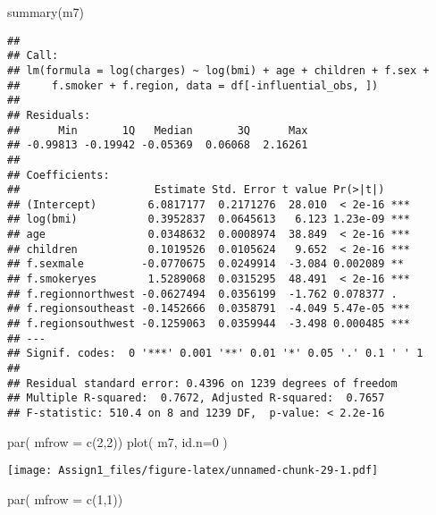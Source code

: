 \documentclass[
]{article}
\newenvironment{Shaded}{\begin{snugshade}}{\end{snugshade}}
\newcommand{\AttributeTok}[1]{\textcolor[rgb]{0.77,0.63,0.00}{#1}}
\newcommand{\DecValTok}[1]{\textcolor[rgb]{0.00,0.00,0.81}{#1}}
\newcommand{\FunctionTok}[1]{\textcolor[rgb]{0.00,0.00,0.00}{#1}}
\newcommand{\NormalTok}[1]{#1}
\begin{document}
\begin{Shaded}
\begin{Highlighting}[]
\FunctionTok{summary}\NormalTok{(m7)}
\end{Highlighting}
\end{Shaded}

\begin{verbatim}
## 
## Call:
## lm(formula = log(charges) ~ log(bmi) + age + children + f.sex + 
##     f.smoker + f.region, data = df[-influential_obs, ])
## 
## Residuals:
##      Min       1Q   Median       3Q      Max 
## -0.99813 -0.19942 -0.05369  0.06068  2.16261 
## 
## Coefficients:
##                     Estimate Std. Error t value Pr(>|t|)    
## (Intercept)        6.0817177  0.2171276  28.010  < 2e-16 ***
## log(bmi)           0.3952837  0.0645613   6.123 1.23e-09 ***
## age                0.0348632  0.0008974  38.849  < 2e-16 ***
## children           0.1019526  0.0105624   9.652  < 2e-16 ***
## f.sexmale         -0.0770675  0.0249914  -3.084 0.002089 ** 
## f.smokeryes        1.5289068  0.0315295  48.491  < 2e-16 ***
## f.regionnorthwest -0.0627494  0.0356199  -1.762 0.078377 .  
## f.regionsoutheast -0.1452666  0.0358791  -4.049 5.47e-05 ***
## f.regionsouthwest -0.1259063  0.0359944  -3.498 0.000485 ***
## ---
## Signif. codes:  0 '***' 0.001 '**' 0.01 '*' 0.05 '.' 0.1 ' ' 1
## 
## Residual standard error: 0.4396 on 1239 degrees of freedom
## Multiple R-squared:  0.7672, Adjusted R-squared:  0.7657 
## F-statistic: 510.4 on 8 and 1239 DF,  p-value: < 2.2e-16
\end{verbatim}

\begin{Shaded}
\begin{Highlighting}[]
\FunctionTok{par}\NormalTok{( }\AttributeTok{mfrow =} \FunctionTok{c}\NormalTok{(}\DecValTok{2}\NormalTok{,}\DecValTok{2}\NormalTok{))}
\FunctionTok{plot}\NormalTok{( m7, }\AttributeTok{id.n=}\DecValTok{0}\NormalTok{ )}
\end{Highlighting}
\end{Shaded}

\texttt{[image: Assign1\_files/figure-latex/unnamed-chunk-29-1.pdf]}

\begin{Shaded}
\begin{Highlighting}[]
\FunctionTok{par}\NormalTok{( }\AttributeTok{mfrow =} \FunctionTok{c}\NormalTok{(}\DecValTok{1}\NormalTok{,}\DecValTok{1}\NormalTok{))}
\end{Highlighting}
\end{Shaded}
\end{document}
